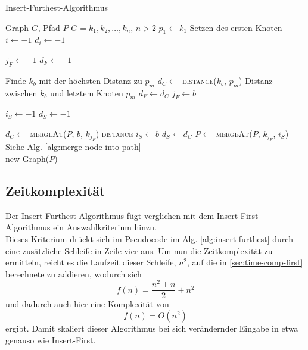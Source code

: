 \begin{algorithm}[H]
    \caption{Insert-Furthest-Algorithmus}
    \label{alg:insert-furthest}
    \begin{algorithmic}[1]
        \Require Graph $G$, Pfad $P$ 
        \Require $G= k_1,k_2,\ldots,k_n$, $n > 2$ 
        \State $p_1 \gets k_1$
        \Comment Setzen des ersten Knoten
        \State $i \gets -1$
        \State $d_i \gets -1$

            \State $j_F \gets -1$
            \State $d_F \gets -1$

                \Comment Finde $k_b$ mit der höchsten Distanz zu $p_m$
                \State $d_C \gets$ \textsc{distance}($k_b$, $p_m$)
                \Comment Distanz zwischen $k_b$ und letztem Knoten $p_m$
                    \State $d_F \gets d_C$
                    \State $j_F \gets b$
                \EndIf
            \EndFor

            \State $i_S \gets -1$
            \State $d_S \gets -1$

                \State $d_C \gets$ \textsc{mergeAt}($P$, $b$, $k_{j_F}$) \textsc{distance}
                    \State $i_S \gets b$
                    \State $d_S \gets d_C$
                \EndIf
            \EndFor
            \State $P \gets$ \textsc{mergeAt}($P$, $k_{j_F}$, $i_S$)
            \Comment Siehe Alg. \vref{alg:merge-node-into-path}
        \EndFor \\
        \Return new Graph($P$)
    \end{algorithmic}
\end{algorithm}

\subsection{Zeitkomplexität}
Der Insert-Furthest-Algorithmus fügt verglichen mit dem Insert-First-Algorithmus ein Auswahlkriterium hinzu.\\
Dieses Kriterium drückt sich im Pseudocode im \ac{Alg.} \vref{alg:insert-furthest} durch eine zusätzliche Schleife in Zeile vier aus.
Um nun die Zeitkomplexität zu ermitteln, reicht es die Laufzeit dieser Schleife, $n^2$, auf die in \vref{sec:time-comp-first} berechnete zu addieren, wodurch sich 
$$f(n) = \frac{n^2+n}{2}+n^2$$
und dadurch auch hier eine Komplexität von
$$f(n) = O(n^2)$$
ergibt.
Damit skaliert dieser Algorithmus bei sich verändernder Eingabe in etwa genauso wie Insert-First.

